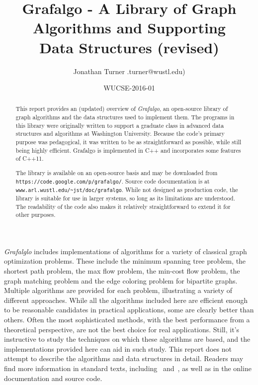 \documentclass[11pt]{article}
\begin{document}
\title{\bf Grafalgo - A Library of Graph \\Algorithms 
and Supporting\\Data Structures (revised)}
 
\author{Jonathan Turner \jon.turner@wustl.edu)}
\date{\normalsize WUCSE-2016-01}
\maketitle

\begin{abstract}
This report provides an (updated) overview of {\sl Grafalgo}, an open-source library
of graph algorithms and the data structures used to implement them.
The programs in this library were originally written to support a graduate
class in advanced data structures and algorithms at Washington University.
Because the code's primary purpose was pedagogical, it was written to
be as straightforward as possible, while still being highly efficient.
Grafalgo is implemented in C++ and incorporates some features of C++11.

The library is available on an open-source basis and may be
downloaded from {\tt https://code.google.com/p/grafalgo/}.
Source code documentation is at {\tt www.arl.wustl.edu/\textasciitilde jst/doc/grafalgo}.
While not designed as production code, the library is suitable for
use in larger systems, so long as its limitations are understood.
The readability of the code also makes it relatively straightforward to extend it for other purposes.
\end{abstract}

\pagestyle{plain}

{\sl Grafalglo} includes implementations of algorithms for
a variety of classical graph optimization problems. These include the
minimum spanning tree problem, the shortest path problem,
the max flow problem, the min-cost flow problem, the graph matching
problem and the edge coloring problem for bipartite graphs. 
Multiple algorithms are provided for each problem, illustrating
a variety of different approaches. While all the algorithms included here
are efficient enough to be reasonable candidates in practical applications,
some are clearly better than others. Often the most sophisticated methods,
with the best performance from a theoretical perspective, are not the best
choice for real applications. Still, it's instructive to study the techniques
on which these algorithms are based, and the implementations provided
here can aid in such study. This report does not attempt to describe the
algorithms and data structures in detail. Readers may find more information
in standard texts, including~\cite{CLRS} and~\cite{TA83},
as well as in the online documentation and source code.
\end{document}
